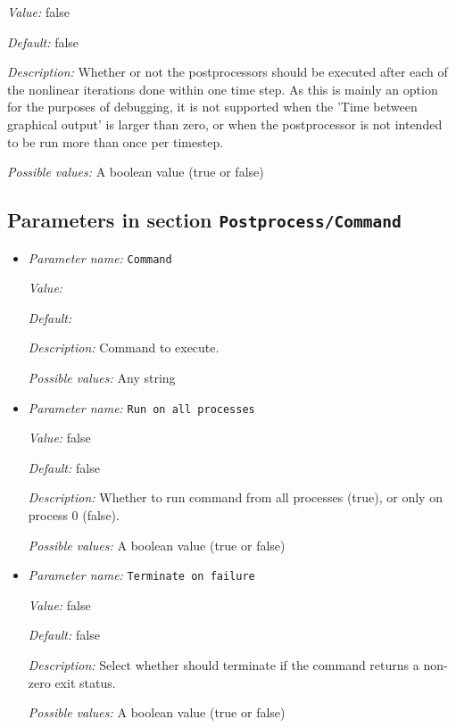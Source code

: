 \begin{itemize}
{\it Value:} false


{\it Default:} false


{\it Description:} Whether or not the postprocessors should be executed after each of the nonlinear iterations done within one time step. As this is mainly an option for the purposes of debugging, it is not supported when the 'Time between graphical output' is larger than zero, or when the postprocessor is not intended to be run more than once per timestep.


{\it Possible values:} A boolean value (true or false)
\end{itemize}



\subsection{Parameters in section \tt Postprocess/Command}
\label{parameters:Postprocess/Command}

\begin{itemize}
\item {\it Parameter name:} {\tt Command}
\label{parameters:Postprocess/Command/Command}


{\it Value:} 


{\it Default:} 


{\it Description:} Command to execute.


{\it Possible values:} Any string
\item {\it Parameter name:} {\tt Run on all processes}
\label{parameters:Postprocess/Command/Run on all processes}
\label{parameters:Postprocess/Command/Run_20on_20all_20processes}


{\it Value:} false


{\it Default:} false


{\it Description:} Whether to run command from all processes (true), or only on process 0 (false).


{\it Possible values:} A boolean value (true or false)
\item {\it Parameter name:} {\tt Terminate on failure}
\label{parameters:Postprocess/Command/Terminate on failure}
\label{parameters:Postprocess/Command/Terminate_20on_20failure}


{\it Value:} false


{\it Default:} false


{\it Description:} Select whether \aspect{} should terminate if the command returns a non-zero exit status.


{\it Possible values:} A boolean value (true or false)
\end{itemize}

